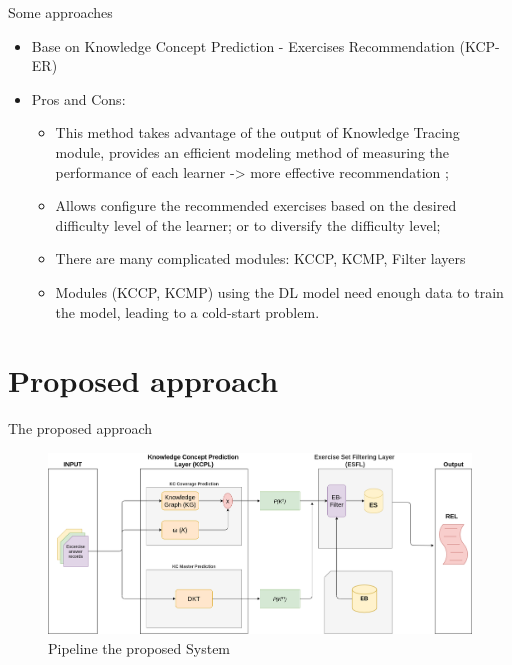 \documentclass[10pt,a4paper,openany]{beamer}
\begin{document}
	\begin{frame}{Some approaches}
		\begin{itemize}
			\item Base on Knowledge Concept Prediction - Exercises Recommendation (KCP-ER)
			
			\item Pros and Cons:
				\begin{itemize}
					\item This method takes advantage of the output of Knowledge Tracing module, provides an efficient modeling method of measuring the performance of each learner -> more effective recommendation ;
					\item Allows configure the recommended exercises based on the desired difficulty level of the learner; or to diversify the difficulty level;
					\item There are many complicated modules: KCCP, KCMP, Filter layers
					\item Modules (KCCP, KCMP) using the DL model need enough data to train the model, leading to a cold-start problem.
				\end{itemize}
		\end{itemize}
	\end{frame}
	
	\section{Proposed approach}
	\begin{frame}{The proposed approach}
		\begin{figure}[htbp]
			\centerline{\includegraphics[scale=0.25]{charts/kcp_er.png}}
			\label{fig_motivation3}
			\caption{Pipeline the proposed System}
		\end{figure}
	\end{frame}	
	
\end{document}
